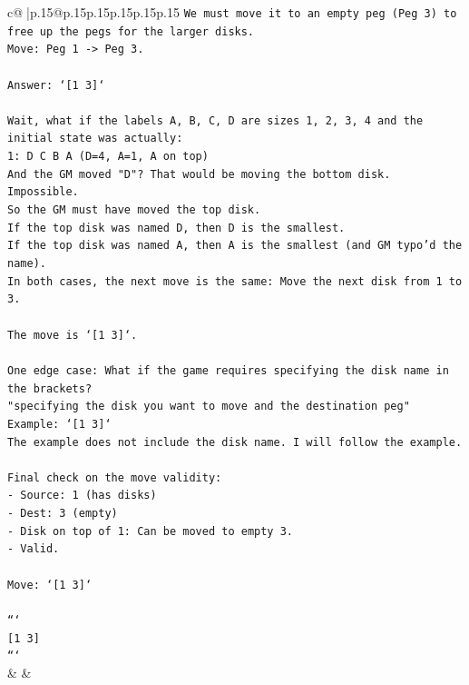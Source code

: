 \documentclass{article}
\begin{document}
{\begin{supertabular}{c@{$\;$}|p{.15\linewidth}@{}p{.15\linewidth}p{.15\linewidth}p{.15\linewidth}p{.15\linewidth}p{.15\linewidth}}
{{{\texttt{We must move it to an empty peg (Peg 3) to free up the pegs for the larger disks.} \\
\texttt{Move: Peg 1 {-}> Peg 3.} \\
\\ 
\texttt{Answer: `{[}1 3{]}`} \\
\\ 
\texttt{Wait, what if the labels A, B, C, D are sizes 1, 2, 3, 4 and the initial state was actually:} \\
\texttt{1: D C B A (D=4, A=1, A on top)} \\
\texttt{And the GM moved "D"? That would be moving the bottom disk. Impossible.} \\
\texttt{So the GM must have moved the top disk.} \\
\texttt{If the top disk was named D, then D is the smallest.} \\
\texttt{If the top disk was named A, then A is the smallest (and GM typo'd the name).} \\
\texttt{In both cases, the next move is the same: Move the next disk from 1 to 3.} \\
\\ 
\texttt{The move is `{[}1 3{]}`.} \\
\\ 
\texttt{One edge case: What if the game requires specifying the disk name in the brackets?} \\
\texttt{"specifying the disk you want to move and the destination peg"} \\
\texttt{Example: `{[}1 3{]}`} \\
\texttt{The example does not include the disk name. I will follow the example.} \\
\\ 
\texttt{Final check on the move validity:} \\
\texttt{{-} Source: 1 (has disks)} \\
\texttt{{-} Dest: 3 (empty)} \\
\texttt{{-} Disk on top of 1: Can be moved to empty 3.} \\
\texttt{{-} Valid.} \\
\\ 
\texttt{Move: `{[}1 3{]}`} \\
\\ 
\texttt{```} \\
\texttt{{[}1 3{]}} \\
\texttt{```} \\
            }
        }
    }
    & & \\ \\


\end{supertabular}}
\end{document}
